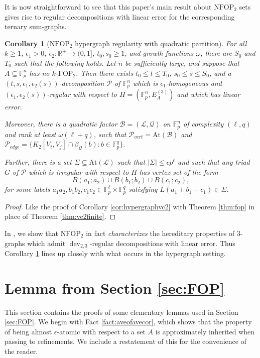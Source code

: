 \documentclass[12pt,oneside,british,a4wide]{amsart}
\newtheorem{corollary}[theorem]{Corollary}
\numberwithin{equation}{section}
\theoremstyle{definition}
\def\F{\mathbb{F}}
\def\FOP{\mathrm{FOP}}
\def\NFOP{\mathrm{NFOP}}
\def\e{\epsilon}
\newcommand{\calL}{\mathcal{L}}
\newcommand{\calB}{\mathcal{B}}
\newcommand{\calP}{\mathcal{P}}
\newcommand{\calQ}{\mathcal{Q}}
\newcommand{\At}{{\mathrm{At}}}
\def\dev{\operatorname{dev}}
\begin{document}
It is now straightforward to see that this paper's main result  about $\NFOP_2$ sets gives rise to regular decompositions with linear error for the corresponding ternary sum-graphs.

\begin{corollary}[$\NFOP_2$ hypergraph regularity with quadratic partition]\label{cor:hypergraphfop}
For all $k\geq 1$, $\e_1>0$, $\e_2:\mathbb{R}^+\rightarrow (0,1]$, $t_0,s_0\geq 1$, and growth functions $\omega$, there are $S_0$ and $T_0$ such that the following holds. Let $n$ be sufficiently large, and suppose that $A\subseteq \F_p^n$ has no $k$-$\FOP_2$.   Then there exists $t_0\leq t\leq T_0$, $s_0\leq s\leq S_0$, and a $(t,s,\e_1,\e_2(s))$-decomposition $\calP$ of $\F_p^n$ which is $\e_1$-homogeneous and $(\e_1,\e_2(s))$-regular with respect to $H=(\F_p^n, E_A^{(3)})$ and which has linear error.    

Moreover, there is a quadratic factor $\calB=(\calL,\calQ)$ on $\F_p^n$ of complexity $(\ell,q)$ and rank at least $\omega(\ell+q)$, such that $\calP_{vert}= \At(\calB)$ and $\calP_{edge}= \{K_2[V_i,V_j]\cap \beta_{\calQ}(b): b\in \F_p^{q}\}$. 

Further,  there is a set $\Sigma\subseteq \At(\calL)$ such that $|\Sigma|\leq \e p^{\ell}$ and such that any triad $G$ of $\calP$ which is irregular with respect to $H$ has vertex set of the form 
$$
B(a_1;a_2)\cup B(b_1;b_2)\cup B(c_1;c_2),
$$
 for some labels $a_1a_2,b_1b_2,c_1c_2\in \F_p^{\ell}\times \F_p^q$ satisfying $L(a_1+b_1+c_1)\in \Sigma$.
\end{corollary}
\begin{proof}
Like the proof of Corollary \ref{cor:hypergraphvc2} with  Theorem \ref{thm:fop} in place of Theorem \ref{thm:vc2finite}.
\end{proof}

In \cite[Theorem 2.50]{Terry.2021b}, we show that $\NFOP_2$ in fact \emph{characterizes} the hereditary properties of $3$-graphs which admit $\dev_{2,3}$-regular decompositions with linear error.  Thus Corollary \ref{cor:hypergraphfop} lines up closely with what occurs in the hypergraph setting.




\section{Lemma from Section \ref{sec:FOP}}\label{app:easy}

This section contains the proofs of some elementary lemmas used in Section \ref{sec:FOP}.  We begin with Fact \ref{fact:aveofavecor}, which shows that the property of being almost $\e$-atomic with respect to a set $A$ is approximately inherited when passing to refinements.  We include a restatement of this for the convenience of the reader. 
\end{document}

